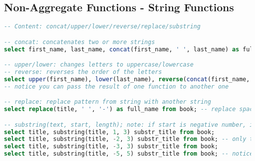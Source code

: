 \subsection{Non-Aggregate Functions - String Functions}
\begin{lstlisting}[language=SQL]
-- Content: concat/upper/lower/reverse/replace/substring

-- concat: concatenates two or more strings
select first_name, last_name, concat(first_name, ' ', last_name) as full_name from author;

-- upper/lower: changes letters to uppercase/lowercase
-- reverse: reverses the order of the letters
select upper(first_name), lower(last_name), reverse(concat(first_name, ' ', last_name)) as full_name from author;
-- notice you can pass the result of one function to another one

-- replace: replace pattern from string with another string
select replace(title, ' ', '-') as full_name from book; -- replace spaces with - in book titles

-- substring(text, start, length); note: if start is negative number, it starts from the end and moves towards the right
select title, substring(title, 1, 3) substr_title from book;
select title, substring(title, -2, 3) substr_title from book; -- only two characters exist since we did -2, so no 3d to show
select title, substring(title, -3, 3) substr_title from book;
select title, substring(title, -5, 5) substr_title from book; -- notice what happens to titles that have less characters than star position
\end{lstlisting}
